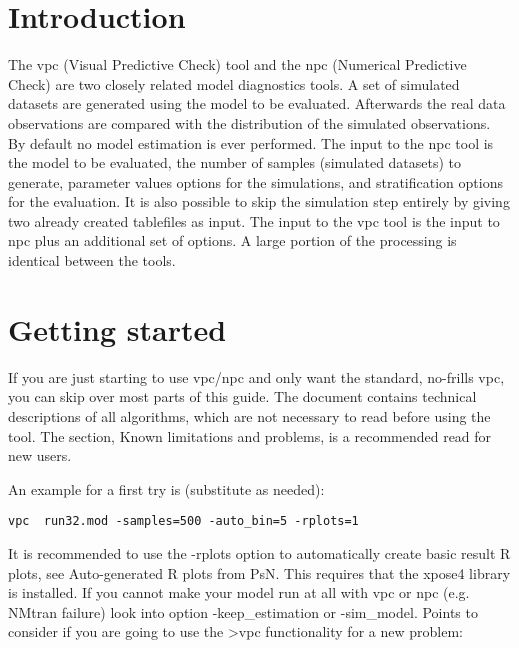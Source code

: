 
\usepackage{hyperref}


\maketitle
\newcommand{\guidetoolname}{vpc}
\tableofcontents
\newpage
\section{Introduction}
The vpc (Visual Predictive Check) tool and the npc (Numerical Predictive Check) are two closely related model diagnostics tools.
A set of simulated datasets are generated using the model to be evaluated. Afterwards the real data observations are compared with the distribution of the simulated observations. By default no model estimation is ever performed.
The input to the npc tool is the model to be evaluated, the number of samples (simulated datasets) to generate, parameter values options for the simulations, and stratification options for the evaluation. It is also possible to skip the simulation step entirely by giving two already created tablefiles as input. 
The input to the vpc tool is the input to npc plus an additional set of options. A large portion of the processing is identical between the tools.

\section{Getting started}
If you are just starting to use vpc/npc and only want the standard, no-frills vpc, you can skip over most parts of this guide. The document contains technical descriptions of all algorithms, which are not necessary to read before using the tool. The section, Known limitations and problems, is a recommended read for new users.

An example for a first try is (substitute as needed):
\begin{verbatim}
vpc  run32.mod -samples=500 -auto_bin=5 -rplots=1
\end{verbatim}
It is recommended to use the -rplots option to automatically create basic result R plots, see Auto-generated R plots from PsN. This requires that the xpose4 library is installed. If you cannot make your model run at all with vpc or npc (e.g. NMtran failure) look into option -keep\_estimation or -sim\_model. Points to consider if you are going to use the >vpc functionality for a new problem:

